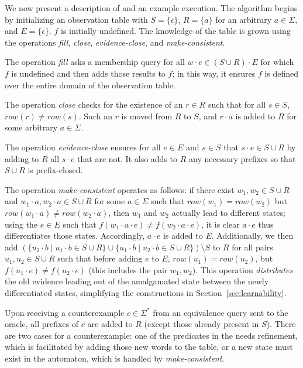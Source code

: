 We now present a description of \alg and an example execution.
The algorithm begins by initializing an observation table
with $S = \{\epsilon\}$, $R = \{a\}$ for an arbitrary $a \in \Sigma$,
and $E = \{\epsilon\}$.
$f$ is initially undefined.
The knowledge of the table
is grown using the operations
\emph{fill}, \emph{close}, \emph{evidence-close}, and \emph{make-consistent}.

The operation \emph{fill} asks a membership query
for all $w \cdot e \in (S \cup R) \cdot E$ for which
$f$ is undefined and then adds those results to $f$;
in this way, it ensures $f$ is defined over the 
entire domain of the observation table.

The operation \emph{close} checks for
the existence of an $r \in R$ such that
for all $s \in S$, $\textit{row}(r) \neq \textit{row}(s)$.
Such an $r$ is moved from $R$ to $S$,
and $r \cdot a$ is added to $R$
for some arbitrary $a \in \Sigma$.

The operation \emph{evidence-close} ensures
for all $e \in E$ and $s \in S$ that
$s \cdot e \in S \cup R$
by adding to $R$ all $s \cdot e$
that are not.
It also adds to $R$ any necessary prefixes
so that $S \cup R$ is prefix-closed.

The operation \emph{make-consistent} operates as follows:
if there exist $w_1, w_2 \in S \cup R$
and $w_1 \cdot a, w_2 \cdot a \in S \cup R$
for some $a \in \Sigma$
such that $\textit{row}(w_1) = \textit{row}(w_2)$
but $\textit{row}(w_1 \cdot a) \neq \textit{row}(w_2 \cdot a)$,
then $w_1$ and $w_2$ actually lead to different states;
using the $e \in E$ such that $f(w_1 \cdot a \cdot e) \neq f(w_2 \cdot a \cdot e)$,
it is clear $a \cdot e$ thus differentiates those states.
Accordingly, $a \cdot e$ is added to $E$.
Additionally, we then add
$(\{u_2 \cdot b \mid u_1 \cdot b \in S \cup R\} \cup \{u_1 \cdot b \mid u_2 \cdot b \in S \cup R\}) \setminus S$
to $R$ for all pairs $u_1, u_2 \in S \cup R$ such that before adding $e$ to $E$,
$\textit{row}(u_1) = \textit{row}(u_2)$,
but $f(u_1 \cdot e) \neq f(u_2 \cdot e)$
(this includes the pair $w_1, w_2$).
This operation \emph{distributes} the old evidence leading
    out of the amalgamated state between the newly differentiated states,
simplifying the constructions in Section~\ref{sec:learnability}.

Upon receiving a counterexample $c \in \Sigma^*$ from 
an equivalence query sent to the oracle,
all prefixes of $c$ are added to $R$
(except those already present in $S$).
There are two cases for a counterexample:
one of the predicates in the \SFA needs refinement,
which is facilitated by adding those new words to the table,
or a new state must exist in the automaton,
which is handled by \emph{make-consistent}.

